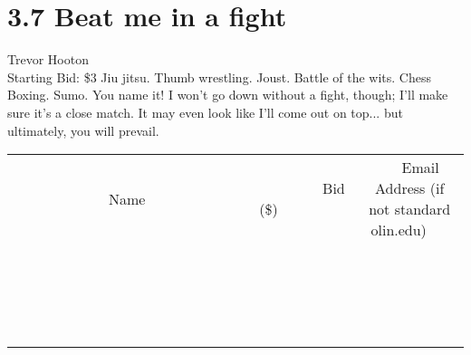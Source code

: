 \documentclass[11pt]{article}
\begin{document}
\section*{3.7 Beat me in a fight}
Trevor Hooton
\\
Starting Bid: \$3
\newline
Jiu jitsu. Thumb wrestling. Joust. Battle of the wits. Chess Boxing. Sumo. You name it! 
I won't go down without a fight, though; I'll make sure it's a close match. It may even look like I'll come out on top... but ultimately, you will prevail.
\\[3ex]
\begin{tabular}{c c c}
~~~~~~~~~~~~~Name~~~~~~~~~~~~~ & ~~~~~~~~~Bid (\$)~~~~~~~~~  & ~~~Email Address (if not standard olin.edu)~~~\\
 & & \\
\hline
 & & \\
\hline
 & & \\
\hline
 & & \\
\hline
 & & \\
\hline
 & & \\
\hline
 & & \\
\hline
 & & \\
\hline
 & & \\
\hline
 & & \\
\hline
 & & \\
\hline
 & & \\
\hline
 & & \\
\hline
 & & \\
\hline
 & & \\
\hline
 & & \\
\hline
 & & \\
\hline
 & & \\
\hline
 & & \\
\hline
\end{tabular}
\newpage
\end{document}
